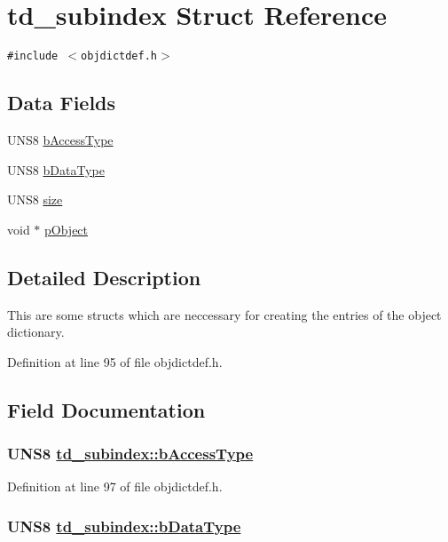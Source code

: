 \hypertarget{structtd__subindex}{
\section{td\_\-subindex Struct Reference}
\label{structtd__subindex}
}
{\tt \#include $<$objdictdef.h$>$}

\subsection*{Data Fields}
\begin{CompactItemize}
\item 
UNS8 \hyperlink{structtd__subindex_c9bfdd809125b0ff777f82158ac4043c}{b\-Access\-Type}
\item 
UNS8 \hyperlink{structtd__subindex_ee8e6e6a00f3766df634e3c5017d2162}{b\-Data\-Type}
\item 
UNS8 \hyperlink{structtd__subindex_660ca8ed5b240340229cfd07c6700d1b}{size}
\item 
void $\ast$ \hyperlink{structtd__subindex_6c83d4e45acd437dcd6746fcf9b7495a}{p\-Object}
\end{CompactItemize}


\subsection{Detailed Description}
This are some structs which are neccessary for creating the entries of the object dictionary. 



Definition at line 95 of file objdictdef.h.

\subsection{Field Documentation}
\hypertarget{structtd__subindex_c9bfdd809125b0ff777f82158ac4043c}{
\subsubsection[bAccessType]{\setlength{\rightskip}{0pt plus 5cm}UNS8 \hyperlink{structtd__subindex_c9bfdd809125b0ff777f82158ac4043c}{td\_\-subindex::b\-Access\-Type}}}
\label{structtd__subindex_c9bfdd809125b0ff777f82158ac4043c}




Definition at line 97 of file objdictdef.h.\hypertarget{structtd__subindex_ee8e6e6a00f3766df634e3c5017d2162}{
\subsubsection[bDataType]{\setlength{\rightskip}{0pt plus 5cm}UNS8 \hyperlink{structtd__subindex_ee8e6e6a00f3766df634e3c5017d2162}{td\_\-subindex::b\-Data\-Type}}}
\label{structtd__subindex_ee8e6e6a00f3766df634e3c5017d2162}




